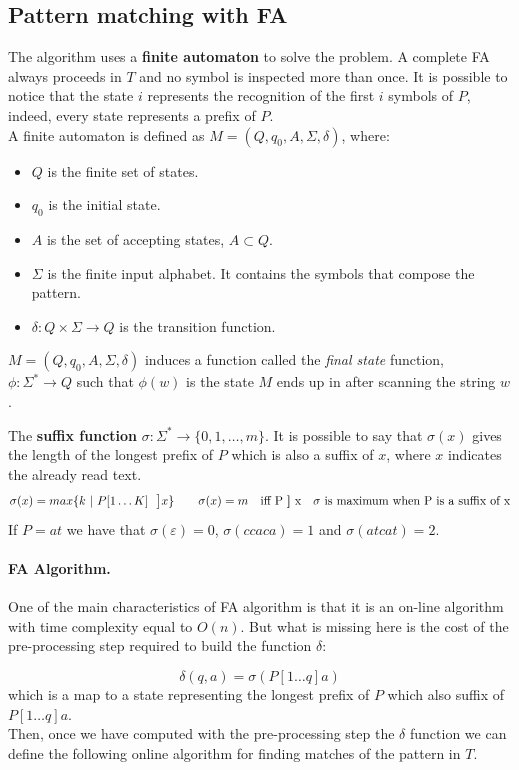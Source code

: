 \subsection{Pattern matching with FA}
The algorithm uses a \textbf{finite automaton} to solve the problem. 
A complete FA always proceeds in $T$ and no symbol is inspected more than once. It is possible to notice that the state $i$ represents the recognition of the first $i$ symbols of $P$, indeed, every state represents a prefix of $P$.\\
A finite automaton is defined as $M = (Q, q_0, A, \Sigma, \delta)$, where:
\begin{itemize}
	\item $Q$ is the finite set of states.
	\item $q_0$ is the initial state.
	\item $A$ is the set of accepting states, $A \subset Q$.
	\item $\Sigma$ is the finite input alphabet. It contains the symbols that compose the pattern.
	\item $\delta: Q \times \Sigma \rightarrow Q$ is the transition function.
\end{itemize}
$M = (Q, q_0, A, \Sigma, \delta)$ induces a function called the \textit{final state} function, $\phi: \Sigma^* \rightarrow Q$ such that $\phi(w)$ is the state $M$ ends up in after scanning the string $w$.
\par \bigskip \noindent
The \textbf{suffix function} $\sigma: \Sigma^* \rightarrow\{ 0,1, \dots, m\}$. It is possible to say that $\sigma(x)$ gives the length of the longest prefix of $P$ which is also a suffix of $x$, where $x$ indicates the already read text.
$$\sigma(x) = max\{k~|~ P[1\dots K]~~ \mathbf{\big]} x\} \qquad \sigma(x) = m \quad \text{iff  } \text{P \textbf{]} x} \quad \sigma \text{ is maximum when P is a suffix of x}$$
If $P=at$ we have that $\sigma(\varepsilon) = 0$, $\sigma(ccaca) = 1$ and $\sigma(atcat) = 2$.

\paragraph{FA Algorithm.} One of the main characteristics of FA algorithm is that it is an on-line algorithm with time complexity equal to $O(n)$. But what is missing here is the cost of the pre-processing step required to build the function $\delta$:

$$ \delta(q,a) = \sigma(P[1\dots q]a)$$
which is a map to a state representing the longest prefix of $P$ which also suffix of $P[1\dots q]a$.\\
Then, once we have computed with the pre-processing step the $\delta$ function we can define the following online algorithm for finding matches of the pattern in $T$.

